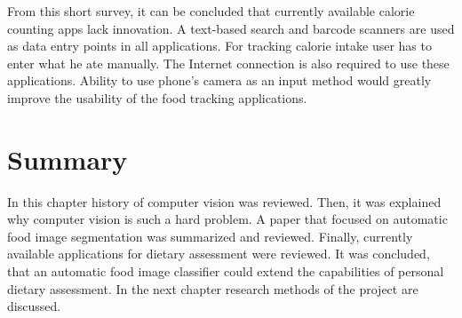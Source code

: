 From this short survey, it can be concluded that currently available calorie counting apps lack innovation. A text-based search and barcode scanners are used as data entry points in all applications. For tracking calorie intake user has to  enter what he ate manually. The Internet connection is  also required to use these applications. Ability to use phone's camera as an input method would greatly improve the usability of the food tracking applications. 

\section{Summary}
In this chapter history of computer vision was reviewed. Then, it was explained why computer vision is such a hard problem. A paper that focused on automatic food image segmentation was summarized and reviewed. Finally, currently available applications for dietary assessment were reviewed. It was concluded, that an automatic food image classifier could extend the capabilities of personal dietary assessment. In the next chapter research methods of the project are discussed.